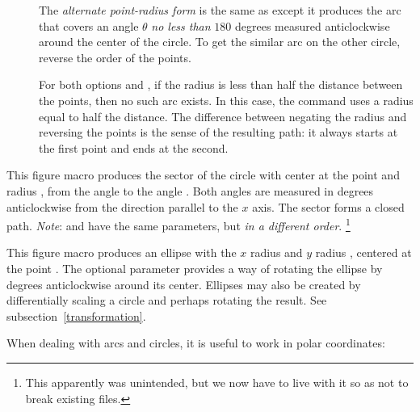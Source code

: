\documentclass[letterpaper]{article}
\begin{document}
\begin{description}
\item[] The \textit{alternate point-radius form} is the same as
 except it produces the arc that covers an angle $\theta$
\emph{no less than} $180$ degrees measured anticlockwise around the
center of the circle. To get the similar arc on the other circle,
reverse the order of the points.

For both options  and , if the radius is less than half
the distance between the points, then no such arc exists. In this case,
the command uses a radius equal to half the distance. The difference
between negating the radius and reversing the points is the sense of
the resulting path: it always starts at the first point and ends at the
second.
\end{description}

\begin{cd}
%
%
\end{cd}

This figure macro produces the sector of the circle with center at the
point  and radius , from the angle 
to the angle . Both angles are measured in degrees
anticlockwise from the direction parallel to the $x$ axis. The sector
forms a closed path. \emph{Note}:  and  have
the same parameters, but \emph{in a different order}.%
    \footnote{This apparently was unintended, but we now have to live
    with it so as not to break existing  files.}


\begin{cd}
\oarg{\meta{$\theta$}}%
%
\end{cd}

This figure macro produces an ellipse with the $x$ radius 
and $y$ radius , centered at the point . The
optional parameter \meta{$\theta$} provides a way of rotating the
ellipse by \meta{$\theta$} degrees anticlockwise around its center.
Ellipses may also be created by differentially scaling a circle and
perhaps rotating the result. See subsection~\ref{transformation}.


When dealing with arcs and circles, it is useful to work in polar
coordinates:

\begin{cd}
%
%
\end{cd}
\end{document}
